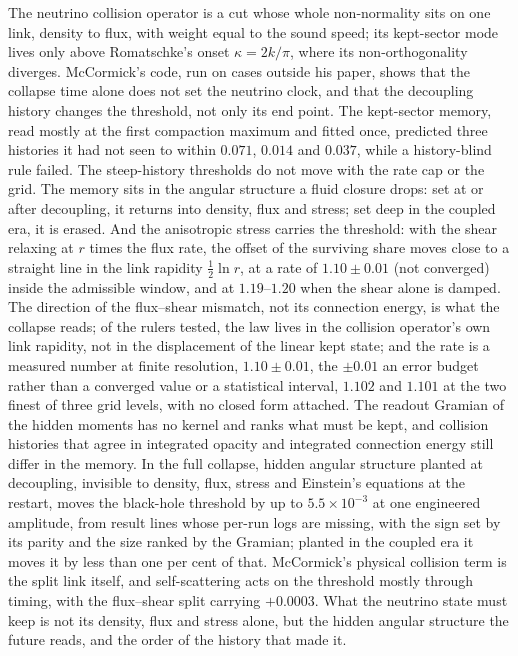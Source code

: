 \documentclass[11pt]{article}
\begin{document}
The neutrino collision operator is a cut whose whole non-normality sits on one link, density to flux, with weight equal to the sound speed; its kept-sector mode lives only above Romatschke's onset $\kappa=2k/\pi$, where its non-orthogonality diverges. McCormick's code, run on cases outside his paper, shows that the collapse time alone does not set the neutrino clock, and that the decoupling history changes the threshold, not only its end point. The kept-sector memory, read mostly at the first compaction maximum and fitted once, predicted three histories it had not seen to within $0.071$, $0.014$ and $0.037$, while a history-blind rule failed. The steep-history thresholds do not move with the rate cap or the grid. The memory sits in the angular structure a fluid closure drops: set at or after decoupling, it returns into density, flux and stress; set deep in the coupled era, it is erased. And the anisotropic stress carries the threshold: with the shear relaxing at $r$ times the flux rate, the offset of the surviving share moves close to a straight line in the link rapidity $\tfrac12\ln r$, at a rate of $1.10\pm0.01$ (not converged) inside the admissible window, and at $1.19$--$1.20$ when the shear alone is damped. The direction of the flux--shear mismatch, not its connection energy, is what the collapse reads; of the rulers tested, the law lives in the collision operator's own link rapidity, not in the displacement of the linear kept state; and the rate is a measured number at finite resolution, $1.10\pm0.01$, the $\pm0.01$ an error budget rather than a converged value or a statistical interval, $1.102$ and $1.101$ at the two finest of three grid levels, with no closed form attached. The readout Gramian of the hidden moments has no kernel and ranks what must be kept, and collision histories that agree in integrated opacity and integrated connection energy still differ in the memory. In the full collapse, hidden angular structure planted at decoupling, invisible to density, flux, stress and Einstein's equations at the restart, moves the black-hole threshold by up to $5.5\times10^{-3}$ at one engineered amplitude, from result lines whose per-run logs are missing, with the sign set by its parity and the size ranked by the Gramian; planted in the coupled era it moves it by less than one per cent of that. McCormick's physical collision term is the split link itself, and self-scattering acts on the threshold mostly through timing, with the flux--shear split carrying $+0.0003$. What the neutrino state must keep is not its density, flux and stress alone, but the hidden angular structure the future reads, and the order of the history that made it.
\end{document}
